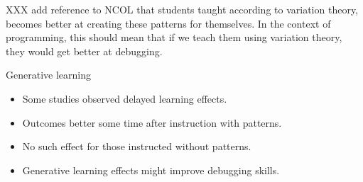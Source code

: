 XXX add reference to NCOL that students taught according to variation theory, 
becomes better at creating these patterns for themselves.
In the context of programming, this should mean that if we teach them using 
variation theory, they would get better at debugging.

\begin{frame}
  \begin{block}{Generative learning~\parencite[pp.~227--228]{NCOL}}
    \begin{itemize}
      \item Some studies observed delayed learning effects.
      \item Outcomes better some time after instruction with patterns.
      \item No such effect for those instructed without patterns.
    \end{itemize}
  \end{block}
\end{frame}

\begin{frame}
  \begin{idea}
    \begin{itemize}
      \item Generative learning effects might improve debugging 
        skills.
    \end{itemize}
  \end{idea}
\end{frame}
